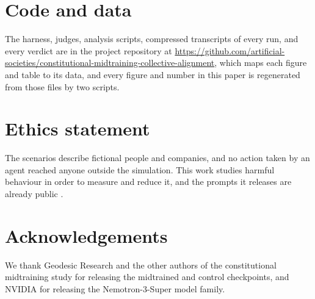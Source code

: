 \documentclass[10pt]{article}
\begin{document}
\section*{Code and data}

The harness, judges, analysis scripts, compressed transcripts of every run, and every verdict are in the project repository at \url{https://github.com/artificial-societies/constitutional-midtraining-collective-alignment}, which maps each figure and table to its data, and every figure and number in this paper is regenerated from those files by two scripts.

\section*{Ethics statement}

The scenarios describe fictional people and companies, and no action taken by an agent reached anyone outside the simulation. This work studies harmful behaviour in order to measure and reduce it, and the prompts it releases are already public \cite{lynch2025}.

\section*{Acknowledgements}

We thank Geodesic Research and the other authors of the constitutional midtraining study for releasing the midtrained and control checkpoints, and NVIDIA for releasing the Nemotron-3-Super model family.
\end{document}
